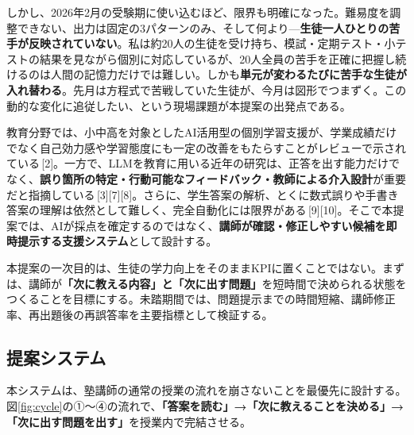 \documentclass[paper=a4,fontsize=10.5bp,jafontsize=10.5bp,twocolumn]{jlreq}
\begin{document}
しかし、2026年2月の受験期に使い込むほど、限界も明確になった。難易度を調整できない、出力は固定の3パターンのみ、そして何より---\textbf{生徒一人ひとりの苦手が反映されていない}。私は約20人の生徒を受け持ち、模試・定期テスト・小テストの結果を見ながら個別に対応しているが、20人全員の苦手を正確に把握し続けるのは人間の記憶力だけでは難しい。しかも\textbf{単元が変わるたびに苦手な生徒が入れ替わる}。先月は方程式で苦戦していた生徒が、今月は図形でつまずく。この動的な変化に追従したい、という現場課題が本提案の出発点である。

教育分野では、小中高を対象としたAI活用型の個別学習支援が、学業成績だけでなく自己効力感や学習態度にも一定の改善をもたらすことがレビューで示されている\,[2]。一方で、LLMを教育に用いる近年の研究は、正答を出す能力だけでなく、\textbf{誤り箇所の特定・行動可能なフィードバック・教師による介入設計}が重要だと指摘している\,[3][7][8]。さらに、学生答案の解析、とくに数式誤りや手書き答案の理解は依然として難しく、完全自動化には限界がある\,[9][10]。そこで本提案では、AIが採点を確定するのではなく、\textbf{講師が確認・修正しやすい候補を即時提示する支援システム}として設計する。

本提案の一次目的は、生徒の学力向上をそのままKPIに置くことではない。まずは、講師が\textbf{「次に教える内容」と「次に出す問題」}を短時間で決められる状態をつくることを目標にする。未踏期間では、問題提示までの時間短縮、講師修正率、再出題後の再誤答率を主要指標として検証する。

\subsection{提案システム}

本システムは、塾講師の通常の授業の流れを崩さないことを最優先に設計する。図\ref{fig:cycle}の①〜④の流れで、\textbf{「答案を読む」→「次に教えることを決める」→「次に出す問題を出す」}を授業内で完結させる。
\end{document}
